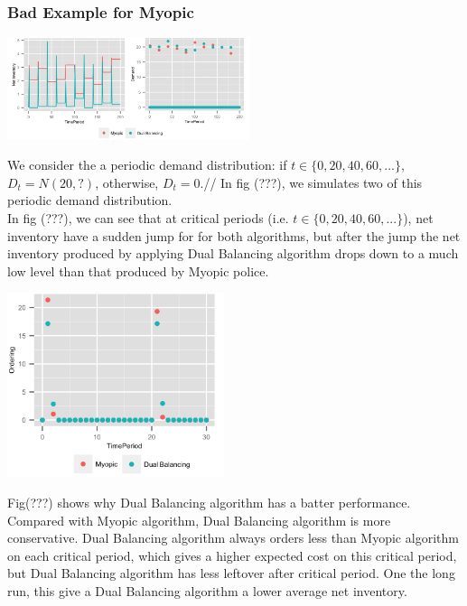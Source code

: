 \documentclass[twoside]{article}
\begin{document}
\begin{multicols}{2}
 \subsubsection{Bad Example for Myopic} 
 \begin{center}
  \includegraphics[width=2.8in]{figures/MyopicBad.png}
\end{center}
  We consider the a periodic demand distribution: if $t\in \{0,20,40,60,...\}$, $D_t=N(20,?)$, otherwise, $D_t=0$.//
  In fig (???), we simulates two of this periodic demand distribution.\\
  In fig (???), we can see that at critical periods (i.e. $t\in \{0,20,40,60,...\}$), net inventory have a sudden jump for for both algorithms, but after the jump the net inventory produced by applying Dual Balancing algorithm drops down to a much low level than that produced by Myopic police.
 \begin{center}
  \includegraphics[width=2.5in]{figures/MyopicBadOrderingWriteup.png}
  \end{center}
  Fig(???) shows why Dual Balancing algorithm has a batter performance. Compared with Myopic algorithm, Dual Balancing algorithm is more conservative. Dual Balancing algorithm always orders less than Myopic algorithm on each critical period, which gives a higher expected cost on this critical period, but Dual Balancing algorithm has less leftover after critical period. One the long run, this give a Dual Balancing algorithm a lower average net inventory.


\end{multicols}
\end{document}

